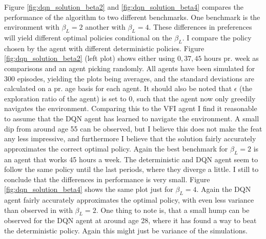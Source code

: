 Figure \ref{fig:dqn_solution_beta2} and \ref{fig:dqn_solution_beta4} compares the performance of the algorithm to two different benchmarks. One benchmark is the environment with $\beta_L = 2$ another with $\beta_L=4$. These differences in preferences will yield different optimal policies conditional on the $\beta_L$. I compare the policy chosen by the agent with different deterministic policies. Figure \ref{fig:dqn_solution_beta2} (left plot) shows either using $0, 37, 45$ hours pr. week as comparisons and an agent picking randomly. All agents have been simulated for 300 episodes, yielding the plots being averages, and the standard deviations are calculated on a pr. age basis for each agent. It should also be noted that $\epsilon$ (the exploration ratio of the agent) is set to 0, such that the agent now only greedily navigates the environment. Comparing this to the VFI agent I find  it reasonable to assume that the DQN agent has learned to navigate the environment. A small dip from around age 55 can be observed, but I believe this does not make the feat any less impressive, and furthermore I believe that the solution fairly accurately approximates the correct optimal policy. Again the best benchmark for $\beta_L = 2$ is an agent that works 45 hours a week. The deterministic and DQN agent seem to follow the same policy until  the last periods, where they diverge a little. I still to conclude that the differences in performance is very small. Figure \ref{fig:dqn_solution_beta4} shows the same plot just for $\beta_L = 4$. Again the DQN agent fairly accurately approximates the optimal policy, with even less variance than observed in with $\beta_L = 2$. One thing to note is, that a small hump can be observed for the DQN agent at around age 28, where it has found a way to beat the deterministic policy. Again this might just be variance of the simulations. 


